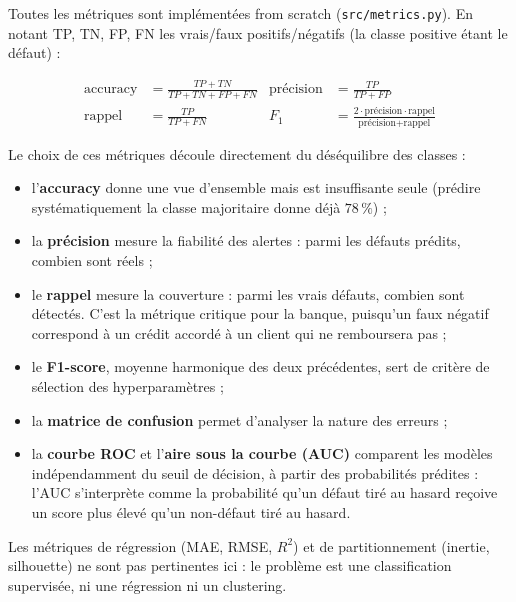 Toutes les métriques sont implémentées from scratch
(\texttt{src/metrics.py}). En notant TP, TN, FP, FN les vrais/faux
positifs/négatifs (la classe positive étant le défaut) :

\begin{align*}
  \text{accuracy} &= \frac{TP + TN}{TP + TN + FP + FN}
  & \text{précision} &= \frac{TP}{TP + FP} \\[4pt]
  \text{rappel} &= \frac{TP}{TP + FN}
  & F_1 &= \frac{2 \cdot \text{précision} \cdot \text{rappel}}
               {\text{précision} + \text{rappel}}
\end{align*}

Le choix de ces métriques découle directement du déséquilibre des classes :

\begin{itemize}
  \item l'\textbf{accuracy} donne une vue d'ensemble mais est insuffisante
    seule (prédire systématiquement la classe majoritaire donne déjà
    $78\,\%$) ;
  \item la \textbf{précision} mesure la fiabilité des alertes : parmi les
    défauts prédits, combien sont réels ;
  \item le \textbf{rappel} mesure la couverture : parmi les vrais défauts,
    combien sont détectés. C'est la métrique critique pour la banque,
    puisqu'un faux négatif correspond à un crédit accordé à un client qui ne
    remboursera pas ;
  \item le \textbf{F1-score}, moyenne harmonique des deux précédentes, sert de
    critère de sélection des hyperparamètres ;
  \item la \textbf{matrice de confusion} permet d'analyser la nature des
    erreurs ;
  \item la \textbf{courbe ROC} et l'\textbf{aire sous la courbe (AUC)}
    \cite{fawcett2006roc} comparent les modèles indépendamment du seuil de
    décision, à partir des probabilités prédites : l'AUC s'interprète comme la
    probabilité qu'un défaut tiré au hasard reçoive un score plus élevé qu'un
    non-défaut tiré au hasard.
\end{itemize}

Les métriques de régression (MAE, RMSE, $R^2$) et de partitionnement (inertie,
silhouette) ne sont pas pertinentes ici : le problème est une classification
supervisée, ni une régression ni un clustering.

